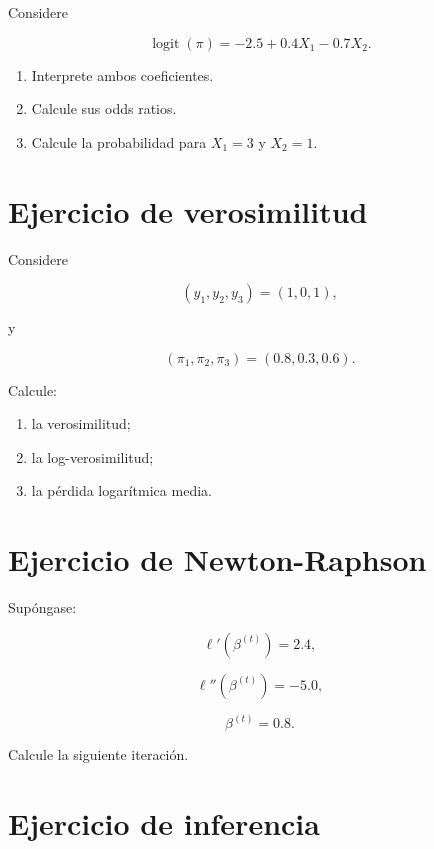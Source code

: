 \documentclass[
  spanish,
  10.5pt,
  letterpaper,
  DIV=11,
  numbers=noendperiod,
  oneside,
  open=any]{scrreprt}
\providecommand{\tightlist}{%
  \setlength{\itemsep}{0pt}\setlength{\parskip}{0pt}}
\theoremstyle{definition}
\theoremstyle{definition}
\theoremstyle{plain}
\theoremstyle{remark}
\begin{document}

Considere

\[
\operatorname{logit}(\pi)
=
-2.5+0.4X_1-0.7X_2.
\]

\begin{enumerate}
\def\labelenumi{\arabic{enumi}.}
\tightlist
\item
  Interprete ambos coeficientes.
\item
  Calcule sus odds ratios.
\item
  Calcule la probabilidad para \(X_1=3\) y \(X_2=1\).
\end{enumerate}

\section*{Ejercicio de verosimilitud}\label{ejercicio-de-verosimilitud}


Considere

\[
(y_1,y_2,y_3)=(1,0,1),
\]

y

\[
(\pi_1,\pi_2,\pi_3)=(0.8,0.3,0.6).
\]

Calcule:

\begin{enumerate}
\def\labelenumi{\arabic{enumi}.}
\tightlist
\item
  la verosimilitud;
\item
  la log-verosimilitud;
\item
  la pérdida logarítmica media.
\end{enumerate}

\section*{Ejercicio de
Newton-Raphson}\label{ejercicio-de-newton-raphson}


Supóngase:

\[
\ell'(\beta^{(t)})=2.4,
\]

\[
\ell''(\beta^{(t)})=-5.0,
\]

\[
\beta^{(t)}=0.8.
\]

Calcule la siguiente iteración.

\section*{Ejercicio de inferencia}\label{ejercicio-de-inferencia}
\end{document}
